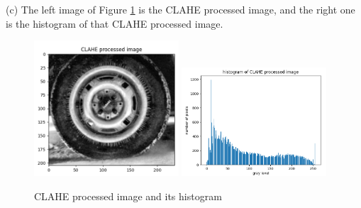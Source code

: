 (c) The left image of Figure \ref{fig:p1c} is the CLAHE processed image, and the right one is 
the histogram of that CLAHE processed image.\\

\begin{figure}[htbp]
    \centering
	\includegraphics[width=0.48\textwidth]{../images/p1/p1c_image.png}
	\includegraphics[width=0.48\textwidth]{../images/p1/p1c_histogram.png}
    \caption{CLAHE processed image and its histogram}
    \label{fig:p1c}
\end{figure}

\newpage